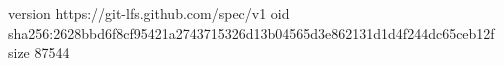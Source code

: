 version https://git-lfs.github.com/spec/v1
oid sha256:2628bbd6f8cf95421a2743715326d13b04565d3e862131d1d4f244dc65ceb12f
size 87544
